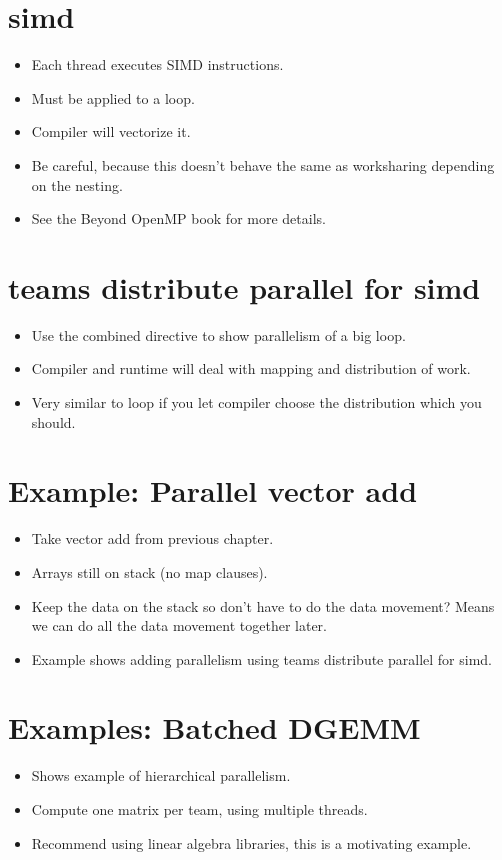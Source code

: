 \section{simd}
\begin{itemize}
  \item Each thread executes SIMD instructions.
  \item Must be applied to a loop.
  \item Compiler will vectorize it.
  \item Be careful, because this doesn't behave the same as worksharing depending on the nesting.
  \item See the Beyond OpenMP book for more details.
\end{itemize}

\section{teams distribute parallel for simd}
\begin{itemize}
  \item Use the combined directive to show parallelism of a big loop.
  \item Compiler and runtime will deal with mapping and distribution of work.
  \item Very similar to loop if you let compiler choose the distribution which you should.
\end{itemize}

\section{Example: Parallel vector add}
\begin{itemize}
  \item Take vector add from previous chapter.
  \item Arrays still on stack (no map clauses).
  \item Keep the data on the stack so don’t have to do the data movement? Means we can do all the data movement together later.
  \item Example shows adding parallelism using teams distribute parallel for simd.
\end{itemize}

\section{Examples: Batched DGEMM}
\begin{itemize}
  \item Shows example of hierarchical parallelism.
  \item Compute one matrix per team, using multiple threads.
  \item Recommend using linear algebra libraries, this is a motivating example.
\end{itemize}

